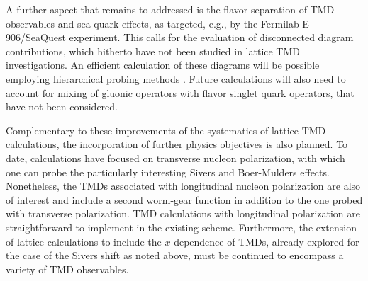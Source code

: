 
A further aspect that remains to addressed is the flavor separation
of TMD observables and sea quark effects, as targeted, e.g., by the Fermilab
E-906/SeaQuest experiment. This calls for the evaluation of disconnected
diagram contributions, which hitherto have not been studied in lattice TMD
investigations. An efficient calculation of these diagrams will be possible
employing hierarchical probing methods \cite{Stathopoulos:2013aci}.
Future calculations will also need to account for mixing of gluonic
operators with flavor singlet quark operators, that have not been considered.

Complementary to these improvements of the systematics of lattice TMD
calculations,  the incorporation of further physics objectives is
also planned. To date, calculations have focused on transverse nucleon
polarization, with which one can probe the particularly interesting
Sivers and Boer-Mulders effects. Nonetheless,  the TMDs associated
with longitudinal nucleon polarization are also of interest and include a
second worm-gear function in addition to the one probed with transverse
polarization. TMD calculations with longitudinal polarization are
straightforward to implement in the existing scheme. Furthermore, the
extension of lattice calculations to include the $x$-dependence of TMDs,
already explored for the case of the Sivers shift as noted above, must be
continued to encompass a variety of TMD observables.

